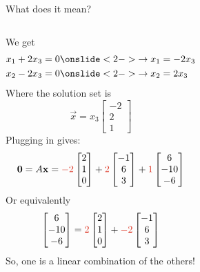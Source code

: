 \documentclass[xcoler=dvipsnames, aspectratio=169]{beamer}
\begin{document}
\begin{frame}{What does it mean?}
    \begin{columns}
        We get
        \begin{align*}
            x_1 + 2x_3 &= 0 \onslide<2->{\rightarrow x_1 = -2x_3}\\
            x_2 - 2x_3 &= 0 \onslide<2->{\rightarrow x_2 = 2x_3}
        \end{align*}
        \pause
        \pause
        Where the solution set is
        \[
            \vec{x} = x_3\begin{bmatrix}
                -2\\2\\1
            \end{bmatrix}
        \]\pause
        Plugging in gives:
        \[
            \vec{0} = A\vec{x} = \rText{-2}\begin{bmatrix}2\\1\\0\end{bmatrix}
                + \rText{2}\begin{bmatrix}-1\\6\\3\end{bmatrix}
                + \rText{1}\begin{bmatrix}6\\-10\\-6\end{bmatrix}
        \]
        \pause
        Or equivalently
        \[
            \begin{bmatrix}6\\-10\\-6\end{bmatrix} = \rText{2}\begin{bmatrix}2\\1\\0\end{bmatrix}
                + \rText{-2}\begin{bmatrix}-1\\6\\3\end{bmatrix}
        \]
        \pause
        So, one is a linear combination of the others!
    \end{columns}
\end{frame}
\end{document}
